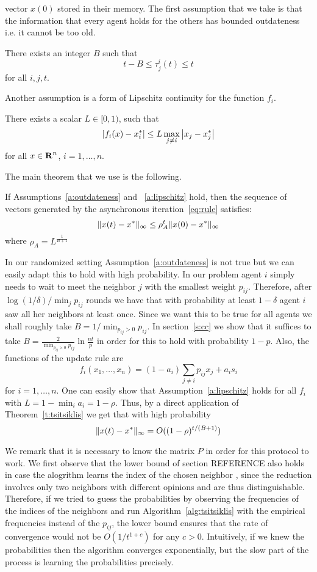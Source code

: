 vector $x(0)$ stored in their memory. 
The first assumption that we take is that the information that every agent
holds for the others has bounded outdateness i.e. it cannot be too old. 
\begin{assumption}\label{a:outdateness}
There exists an integer $B$ such that 
\[
t-B \leq \tau_j^i(t) \leq t
\]
for all $i,j,t$.
\end{assumption}
Another assumption is a form of Lipschitz continuity for the function $f_i$.
\begin{assumption}\label{a:lipschitz}
There exists a scalar $L \in [0,1)$, such that 
\[
\left|f_i(x) - x_i^*\right| \leq L \max_{j \neq i}\left|x_j - x_j^*\right|
\]
for all $x \in \bm{\mathrm{R}}^n$, $i = 1,\ldots, n$.
\end{assumption}
The main theorem that we use is the following. 
\begin{theorem}[{{\cite{BT97}}}]\label{t:tsitsiklis}
If Assumptions~\ref{a:outdateness} and ~\ref{a:lipschitz} hold, 
then the sequence of vectors generated 
by the asynchronous iteration~\ref{eq:rule} satisfies:
\[
\| x(t) - x^* \|_{\infty} \leq \rho_A^t\| x(0) - x^* \|_{\infty}
\]
where $\rho_A = L^{\frac{1}{B+1}}$
\end{theorem}
In our randomized setting Assumption~\ref{a:outdateness} is not true 
but we can easily adapt this to
hold with high probability. In our problem
agent $i$ simply needs to wait to meet the neighbor $j$ with the smallest
weight $p_{ij}$. Therefore, after $\log(1/\delta)/\min_{j} p_{ij}$ rounds
we have that with probability at least $1-\delta$ agent $i$ saw all her
neighbors at least once. Since we want this to be true for all agents
we shall roughly take $B = 1/\min_{p_{ij} > 0} {p_{ij}}$.
In section~\ref{s:cc} we show that it suffices to take 
$B = \frac{2}{\min_{p_{ij} > 0} {p_{ij}}}\ln\frac{nt}{p}$
in order for this to hold with probability $1-p$.
Also, the functions of the update rule are
\[
f_i(x_1,\ldots,x_n) = (1-a_i)\sum_{j \neq i} p_{ij} x_j + a_i s_i
\] 
for $i = 1,\ldots,n$.
One can easily show that Assumption~\ref{a:lipschitz} holds for all $f_i$
with $L = 1 - \min_i a_i = 1 - \rho$. 
Thus, by a direct application of Theorem~\ref{t:tsitsiklis} 
we get that with high probability
\[
  \| x(t) - x^* \|_{\infty} = O((1-\rho)^{t/(B+1)})
\]

We remark that it is necessary to know the matrix $P$ in order for this 
protocol to work. We first observe that the lower bound of section REFERENCE
also holds in case the alogrithm learns the index of the chosen neighbor
, since the reduction involves only two neighbors with different opinions and
are thus distinguishable. 
Therefore, if we tried to guess the probabilities by observing 
the frequencies of the indices of the neighbors and run Algorithm~\ref{alg:tsitsiklis}
with the empirical frequencies instead of the $p_{ij}$, the lower bound
ensures that the rate of convergence would not be $O(1/t^{1+c})$ for any $c>0$.  
Intuitively, if we knew the probabilities then the algorithm converges exponentially,
but the slow part of the process is learning the probabilities 
precisely.

